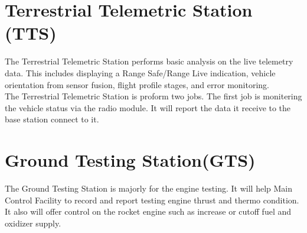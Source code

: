 \documentclass[12pt,article]{memoir}
\begin{document}
\chapter{Terrestrial Telemetric Station (TTS)}
The Terrestrial Telemetric Station performs basic analysis on the live telemetry data. This includes displaying a Range Safe/Range Live indication, vehicle orientation from sensor fusion, flight profile stages, and error monitoring.\\
The Terrestrial Telemetric Station is proform two jobs. The first job is monitering the vehicle status via the radio module. It will report the data it receive to the base station connect to it. 
\newpage
\chapter{Ground Testing Station(GTS)}
The Ground Testing Station is majorly for the engine testing. It will help Main Control Facility to record and report testing engine thrust and thermo condition. It also will offer control on the rocket engine such as increase or cutoff fuel and oxidizer supply.
\end{document}
